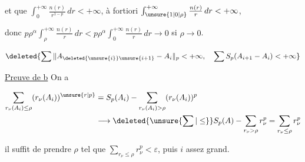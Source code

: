 et que $\int_0^{+\infty}\frac{n(r)}{r^{1-p}}\,dr<+\infty$, à fortiori $\int_{\unsure{1|0|\rho}}^{+\infty}\frac{n(r)}r\,dr<+\infty$,

donc $p\rho^\alpha\int_\rho^{+\infty}\frac{n(r)}r\,dr<p\rho^\alpha\int_0^{+\infty}\frac{n(r)}r\,dr\to0$ si $\rho\to0$.


\[
\deleted{\sum\|A_{\deleted{\unsure{i}}\unsure{i+1}}-A_i\|_p<+\infty,\quad
\sum S_p(A_{i+1}-A_{i})<+\infty}
\]


\uline{Preuve de b} On a

\[
\begin{aligned}
\sum_{r_\nu(A_i)\leq\rho}(r_\nu(A_i))^{\unsure{r|p}}&=S_p(A_i)-\sum_{r_\nu(A_i)>\rho}(r_\nu(A_i))^p\\
&\longrightarrow\deleted{\unsure{\sum|\leq}} S_p(A)-\sum_{r_\nu>\rho}r_\nu^p=\sum_{r_\nu\leq\rho}r_\nu^p
\end{aligned}
\]

il suffit de prendre $\rho$ tel que $\sum_{r_\nu\leq\rho}r_\nu^p<\varepsilon$, puis $i$ assez grand.
